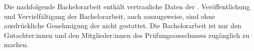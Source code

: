 Die nachfolgende Bachelorarbeit enthält vertrauliche Daten der \partnerunternehmen.
Veröffentlichung und Vervielfältigung der Bachelorarbeit, auch auszugsweise, sind
ohne ausdrückliche Genehmigung der \partnerunternehmen nicht gestattet.
Die Bachelorarbeit ist nur den Gutachter:innen und den Mitglieder:innen des Prüfungsausschusses
zugänglich zu machen.